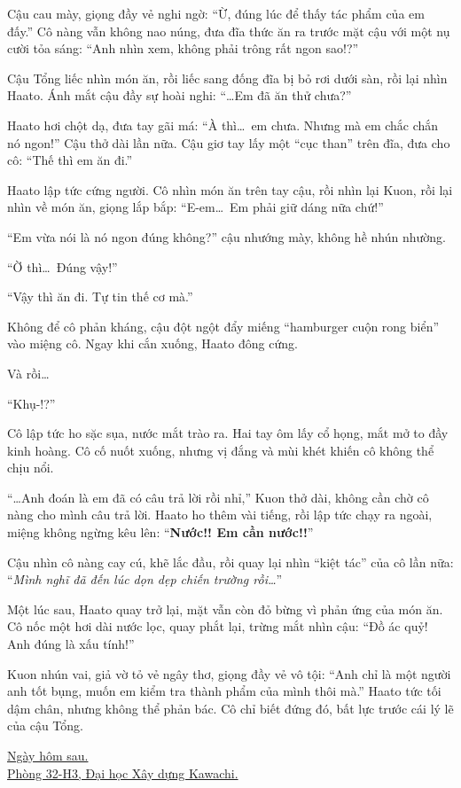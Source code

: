 \documentclass[../main.tex]{subfiles}
\begin{document}
Cậu cau mày, giọng đầy vẻ nghi ngờ: ``Ừ, đúng lúc để thấy tác phẩm của em đấy.'' Cô nàng vẫn không nao núng, đưa đĩa thức ăn ra trước mặt cậu với một nụ cười tỏa sáng: ``Anh nhìn xem, không phải trông rất ngon sao!?''

Cậu Tổng liếc nhìn món ăn, rồi liếc sang đống đĩa bị bỏ rơi dưới sàn, rồi lại nhìn Haato. Ánh mắt cậu đầy sự hoài nghi: ``\dots Em đã ăn thử chưa?''

Haato hơi chột dạ, đưa tay gãi má: ``À thì\dots\ em chưa. Nhưng mà em chắc chắn nó ngon!'' Cậu thở dài lần nữa. Cậu giơ tay lấy một ``cục than'' trên đĩa, đưa cho cô: ``Thế thì em ăn đi.''

Haato lập tức cứng người. Cô nhìn món ăn trên tay cậu, rồi nhìn lại Kuon, rồi lại nhìn về món ăn, giọng lắp bắp: ``E-em\dots\ Em phải giữ dáng nữa chứ!''

``Em vừa nói là nó ngon đúng không?'' cậu nhướng mày, không hề nhún nhường.

``Ờ thì\dots\ Đúng vậy!''

``Vậy thì ăn đi. Tự tin thế cơ mà.''

Không để cô phản kháng, cậu đột ngột đẩy miếng ``hamburger cuộn rong biển'' vào miệng cô. Ngay khi cắn xuống, Haato đông cứng.

Và rồi\dots

``Khụ-!?''

Cô lập tức ho sặc sụa, nước mắt trào ra. Hai tay ôm lấy cổ họng, mắt mở to đầy kinh hoàng. Cô cố nuốt xuống, nhưng vị đắng và mùi khét khiến cô không thể chịu nổi.

``\dots Anh đoán là em đã có câu trả lời rồi nhỉ,'' Kuon thở dài, không cần chờ cô nàng cho mình câu trả lời. Haato ho thêm vài tiếng, rồi lập tức chạy ra ngoài, miệng không ngừng kêu lên: ``\textbf{Nước!! Em cần nước!!}''

Cậu nhìn cô nàng cay cú, khẽ lắc đầu, rồi quay lại nhìn ``kiệt tác'' của cô lần nữa: ``\textit{Mình nghĩ đã đến lúc dọn dẹp chiến trường rồi\dots}''

Một lúc sau, Haato quay trở lại, mặt vẫn còn đỏ bừng vì phản ứng của món ăn. Cô nốc một hơi dài nước lọc, quay phắt lại, trừng mắt nhìn cậu: ``Đồ ác quỷ! Anh đúng là xấu tính!''

Kuon nhún vai, giả vờ tỏ vẻ ngây thơ, giọng đầy vẻ vô tội: ``Anh chỉ là một người anh tốt bụng, muốn em kiểm tra thành phẩm của mình thôi mà.'' Haato tức tối dậm chân, nhưng không thể phản bác. Cô chỉ biết đứng đó, bất lực trước cái lý lẽ của cậu Tổng.

\begin{center}
  \uline{Ngày hôm sau.\\Phòng 32-H3, Đại học Xây dựng Kawachi.}
\end{center}
\end{document}
